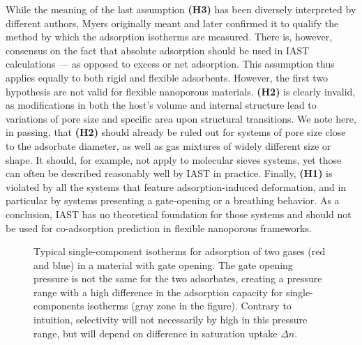 \documentclass[thesis]{subfiles}
\begin{document}
While the meaning of the last assumption \textbf{(H3)} has been diversely
interpreted by different authors, Myers\cite{Myers1965} originally meant and
later confirmed\cite{Myers2014} it to qualify the method by which the adsorption
isotherms are measured. There is, however, consensus on the fact that absolute
adsorption should be used in IAST calculations --- as opposed to excess or net
adsorption\cite{Brandani2016}. This assumption thus applies equally to both
rigid and flexible adsorbents. However, the first two hypothesis are not valid
for flexible nanoporous materials. \textbf{(H2)} is clearly invalid, as
modifications in both the host's volume and internal structure lead to
variations of pore size and specific area upon structural transitions. We note
here, in passing, that \textbf{(H2)} should already be ruled out for systems of
pore size close to the adsorbate diameter, as well as gas mixtures of widely
different size or shape. It should, for example, not apply to molecular sieves
systems, yet those can often be described reasonably well by IAST in practice.
Finally, \textbf{(H1)} is violated by all the systems that feature
adsorption-induced deformation, and in particular by systems presenting a
gate-opening or a breathing behavior. As a conclusion, IAST has no theoretical
foundation for those systems and should not be used for co-adsorption prediction
in flexible nanoporous frameworks.

\begin{figure}[htp]
    \centering
    
    \caption{Typical single-component isotherms for adsorption of two gases (red
    and blue) in a material with gate opening. The gate opening pressure is not
    the same for the two adsorbates, creating a pressure range with a high
    difference in the adsorption capacity for single-components isotherms (gray
    zone in the figure). Contrary to intuition, selectivity will not necessarily
    by high in this pressure range, but will depend on difference in saturation
    uptake $\Delta n$.}
    \label{fig:open-close-selectivity}
\end{figure}
\end{document}
